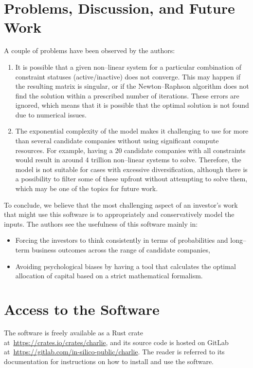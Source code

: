\documentclass{article}
\begin{document}
\section{Problems, Discussion, and Future Work}
\label{sec:futureWork}

\noindent A couple of problems have been observed by the authors:
\begin{enumerate}
    \item It is possible that a given non--linear system for a particular
    combination of constraint statuses (active/inactive) does not converge. This
    may happen if the resulting matrix is singular, or if the Newton--Raphson
    algorithm does not find the solution within a prescribed number of
    iterations. These errors are ignored, which means that it is possible that
    the optimal solution is not found due to numerical issues.
    \item The exponential complexity of the model makes it challenging to
    use for more than several candidate companies without using significant
    compute resources. For example, having a 20 candidate companies with all
    constraints would result in around 4 trillion non--linear systems to solve.
    Therefore, the model is not suitable for cases with excessive
    diversification, although there is a possibility to filter some of these
    upfront without attempting to solve them, which may be one of the topics for
    future work.
\end{enumerate}

\indent To conclude, we believe that the most challenging aspect of an
investor's work that might use this software is to appropriately and
conservatively model the inputs. The authors see the usefulness of this software
mainly in:
\begin{itemize}
    \item Forcing the investors to think consistently in terms of probabilities
    and long--term business outcomes across the range of candidate companies,
    \item Avoiding psychological biases by having a tool that calculates the
    optimal allocation of capital based on a strict mathematical formalism.
\end{itemize}

\section{Access to the Software}

\noindent The software is freely available as a Rust crate
at~\url{https://crates.io/crates/charlie}, and its source code is hosted on
GitLab at~\url{https://gitlab.com/in-silico-public/charlie}. The reader is
referred to its documentation for instructions on how to install and use the
software.

\clearpage



\end{document}
